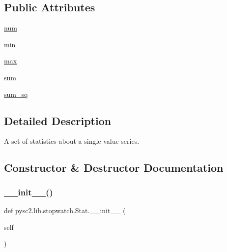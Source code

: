 \subsection*{Public Attributes}
\begin{DoxyCompactItemize}
\item 
\mbox{\hyperlink{classpysc2_1_1lib_1_1stopwatch_1_1_stat_a8bee98cf43b61c5d1b3ba35de83e7e06}{num}}
\item 
\mbox{\hyperlink{classpysc2_1_1lib_1_1stopwatch_1_1_stat_aa12a7c0cababb577e811305283e53c46}{min}}
\item 
\mbox{\hyperlink{classpysc2_1_1lib_1_1stopwatch_1_1_stat_a359d7d8198ff4be60ab39684c33703bb}{max}}
\item 
\mbox{\hyperlink{classpysc2_1_1lib_1_1stopwatch_1_1_stat_accb97d6c4651052a2cf51a6f216a0153}{sum}}
\item 
\mbox{\hyperlink{classpysc2_1_1lib_1_1stopwatch_1_1_stat_a6d288bd17b08cf8bfa684100c5dd113e}{sum\+\_\+sq}}
\end{DoxyCompactItemize}


\subsection{Detailed Description}
\begin{DoxyVerb}A set of statistics about a single value series.\end{DoxyVerb}
 

\subsection{Constructor \& Destructor Documentation}
\mbox{\label{classpysc2_1_1lib_1_1stopwatch_1_1_stat_a3ad7dce5fecb54fa4a9021c35e51989d}} 
\subsubsection{\texorpdfstring{\+\_\+\+\_\+init\+\_\+\+\_\+()}{\_\_init\_\_()}}
{\footnotesize\ttfamily def pysc2.\+lib.\+stopwatch.\+Stat.\+\_\+\+\_\+init\+\_\+\+\_\+ (\begin{DoxyParamCaption}\item[{}]{self }\end{DoxyParamCaption})}



